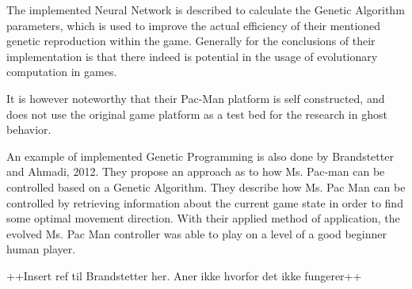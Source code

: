 The implemented Neural Network is described to calculate the Genetic Algorithm parameters, which is used to improve the actual efficiency of their mentioned genetic reproduction within the game. Generally for the conclusions of their implementation is that there indeed is potential in the usage of evolutionary computation in games.

It is however noteworthy that their Pac-Man platform is self constructed, and does not use the original game platform as a test bed for the research in ghost behavior.

An example of implemented Genetic Programming is also done by Brandstetter and Ahmadi, 2012. They propose an approach as to how Ms. Pac-man can be controlled based on a Genetic Algorithm.
They describe how Ms. Pac Man can be controlled by retrieving information about the current game state in order to find some optimal movement direction.
With their applied method of application, the evolved Ms. Pac Man controller was able to play on a level of a good beginner human player.


++Insert ref til Brandstetter her. Aner ikke hvorfor det ikke fungerer++